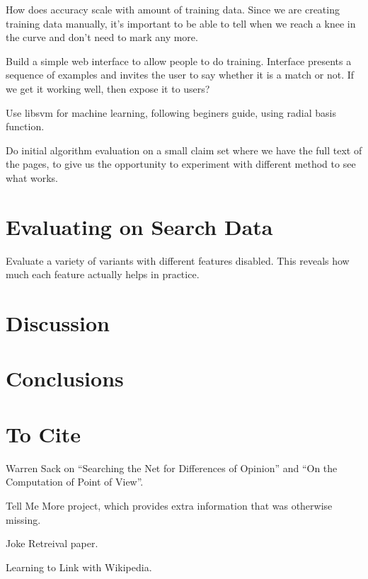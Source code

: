 \documentclass{acm_proc_article-sp}
\begin{document}
How does accuracy scale with amount of training data. Since we are creating training data manually, it's important to be able to tell when we reach a knee in the curve and don't need to mark any more.

Build a simple web interface to allow people to do training. Interface presents a sequence of examples and invites the user to say whether it is a match or not. If we get it working well, then expose it to users?

Use libsvm for machine learning, following beginers guide, using radial basis function.

Do initial algorithm evaluation on a small claim set where we have the full text of the pages, to give us the opportunity to experiment with different method to see what works.

\section{Evaluating on Search Data}

Evaluate a variety of variants with different features disabled. This reveals how much each feature actually helps in practice.

\section{Discussion}

\section{Conclusions}

\section{To Cite}

Warren Sack on ``Searching the Net for Differences of Opinion'' and ``On the Computation of Point of View''.

Tell Me More project, which provides extra information that was otherwise missing.

Joke Retreival paper.

Learning to Link with Wikipedia.
\end{document}
